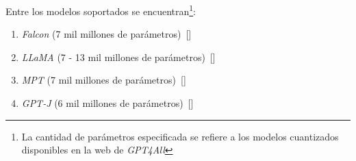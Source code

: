         Entre los modelos soportados se encuentran\footnote{La cantidad de parámetros especificada se refiere a los modelos cuantizados disponibles en la web de \emph{GPT4All}}:

        \begin{enumerate}
            \item \emph{Falcon} (7 mil millones de parámetros)~[\cite{falcon}]
            \item \emph{LLaMA} (7 - 13 mil millones de parámetros)~[\cite{llama}]
            \item \emph{MPT} (7 mil millones de parámetros)~[\cite{mpt}]
            \item \emph{GPT-J} (6 mil millones de parámetros)~[\cite{gptj}]
        \end{enumerate}

